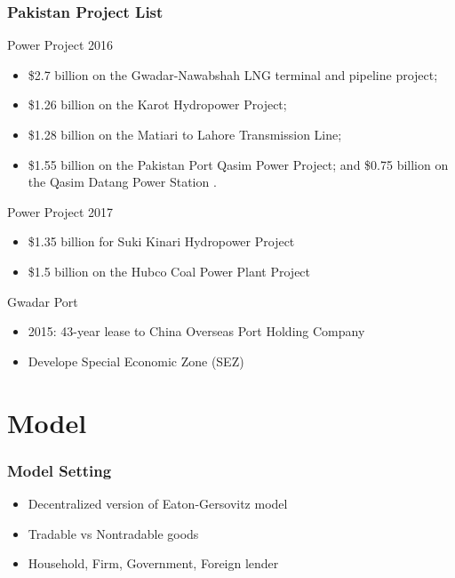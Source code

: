 \documentclass[mathserif]{beamer}
\begin{document}
    \begin{frame}
        \frametitle{Pakistan Project List}
        Power Project 2016
        \begin{itemize}
            \item \$2.7 billion on the Gwadar-Nawabshah LNG terminal and pipeline project;
            \item \$1.26 billion on the Karot Hydropower Project;
            \item \$1.28 billion on the Matiari to Lahore Transmission Line;
            \item \$1.55 billion on the Pakistan Port Qasim Power Project; and \$0.75 billion on the Qasim Datang Power Station \citep*{Horn-Reinhart-Trebesch-21}.
        \end{itemize}
        \vfill
        Power Project 2017
        \begin{itemize}
            \item \$1.35 billion for Suki Kinari Hydropower Project
            \item \$1.5 billion on the Hubco Coal Power Plant Project
        \end{itemize}
        \vfill
        Gwadar Port
        \begin{itemize}
            \item 2015: 43-year lease to China Overseas Port Holding Company
            \item Develope Special Economic Zone (SEZ)
        \end{itemize}
    \end{frame}

    \section{Model}
    \begin{frame}
        \frametitle{Model Setting}

        \begin{itemize}
            \item Decentralized version of Eaton-Gersovitz model
            \item Tradable vs Nontradable goods
            \item Household, Firm, Government, Foreign lender
        \end{itemize}

    \end{frame}
\end{document}
